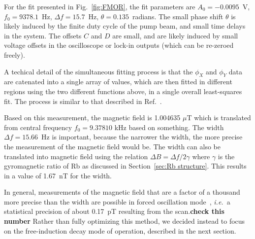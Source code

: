 For the fit presented in Fig.~\ref{fig:FMOR}, the fit parameters are
$A_0=-0.0095$~V, $f_0=9378.1$~Hz, $\Delta f=15.7$~Hz,
$\theta=0.135$~radians.  The small phase shift $\theta$ is likely
induced by the finite duty cycle of the pump beam, and small time
delays in the system.  The offsets $C$ and $D$ are small, and are
likely induced by small voltage offsets in the oscilloscope or lock-in
outputs (which can be re-zeroed freely).



A techical detail of the simultaneous fitting process is that the
$\phi_X$ and $\phi_Y$ data are catenated into a single array of
values, which are then fitted in different regions using the two
different functions above, in a single overall least-squares fit.  The
process is similar to that described in Ref.~\cite{mythesis}.

Based on this measurement, the magnetic field is 1.004635 $\mu$T which is translated from central frequency $f_0= 9.37810$ kHz
based on something. The width $\Delta f=15.66$~Hz is important, because the narrower the
width, the more precise the measurement of the magnetic field would
be.  The width can also be translated into magnetic field using the
relation $\Delta B= \Delta f/2 \gamma$ where $\gamma$ is the
gyromagnetic ratio of Rb as discussed in
Section~\ref{sec:Rb structure}.  This results in a value
of 1.67~nT for the width.

In general, measurements of the magnetic field that are a factor of a
thousand more precise than the width are possible in forced
oscillation mode~\cite{mythesis}, {\it i.e.}~a statistical
precision of about 0.17~pT resulting from the scan.{\bf check this
  number} Rather than fully optimizing this method, we decided instead
to focus on the free-induction decay mode of operation, described in
the next section.




